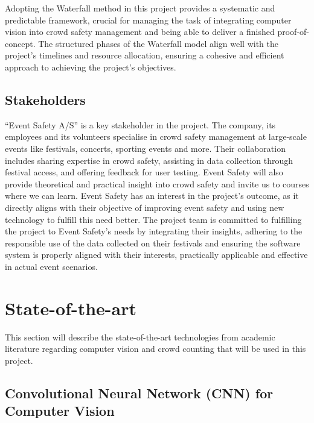 \documentclass[
]{article}
\begin{document}
Adopting the Waterfall method in this project provides a systematic and
predictable framework, crucial for managing the task of integrating
computer vision into crowd safety management and being able to deliver a
finished proof-of-concept. The structured phases of the Waterfall model
align well with the project's timelines and resource allocation,
ensuring a cohesive and efficient approach to achieving the project's
objectives.

\hypertarget{stakeholders}{%
\subsection{Stakeholders}\label{stakeholders}}

``Event Safety A/S'' is a key stakeholder in the project. The company,
its employees and its volunteers specialise in crowd safety management
at large-scale events like festivals, concerts, sporting events and
more. Their collaboration includes sharing expertise in crowd safety,
assisting in data collection through festival access, and offering
feedback for user testing. Event Safety will also provide theoretical
and practical insight into crowd safety and invite us to courses where
we can learn. Event Safety has an interest in the project's outcome, as
it directly aligns with their objective of improving event safety and
using new technology to fulfill this need better. The project team is
committed to fulfilling the project to Event Safety's needs by
integrating their insights, adhering to the responsible use of the data
collected on their festivals and ensuring the software system is
properly aligned with their interests, practically applicable and
effective in actual event scenarios.

\newpage{}

\hypertarget{sec-softa}{%
\section{State-of-the-art}\label{sec-softa}}

This section will describe the state-of-the-art technologies from
academic literature regarding computer vision and crowd counting that
will be used in this project.

\hypertarget{convolutional-neural-network-cnn-for-computer-vision}{%
\subsection{Convolutional Neural Network (CNN) for Computer
Vision}\label{convolutional-neural-network-cnn-for-computer-vision}}
\end{document}
